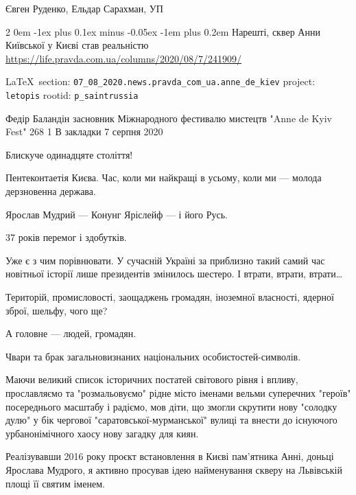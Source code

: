 \documentclass[a4paper,11pt]{extreport}
\makeatletter
\renewcommand\subsection{%
  \clearpage
    \@startsection{subsection}%
    {2}%
    {0em}%
    {-1ex plus 0.1ex minus -0.05ex}%
    {-1em plus 0.2em}%
    {\scshape\bfseries\Large}%
}
\makeatother
\begin{document}
Євген Руденко, Ельдар Сарахман, УП
 
 
\subsection{Нарешті, сквер Анни Київської у Києві став реальністю}
\label{sec:07_08_2020.news.pravda_com_ua.anne_de_kiev}
\url{https://life.pravda.com.ua/columns/2020/08/7/241909/}
  
\vspace{0.5cm}
 {\ifDEBUG\small\LaTeX~section: \verb|07_08_2020.news.pravda_com_ua.anne_de_kiev| project: \verb|letopis| rootid: \verb|p_saintrussia| \fi}
\vspace{0.5cm}

Федір Баландін засновник Міжнародного фестивалю мистецтв "Anne de Kyiv Fest"
268 1 В закладки 7 серпня 2020

Блискуче одинадцяте століття!

Пентеконтаетія Києва. Час, коли ми найкращі в усьому, коли ми --- молода
дерзновенна держава.

Ярослав Мудрий --- Конунг Яріслейф --- і його Русь.

37 років перемог і здобутків.

Уже є з чим порівнювати. У сучасній Україні за приблизно такий самий час
новітньої історії лише президентів змінилось шестеро. І втрати, втрати, втрати…

Територій, промисловості, заощаджень громадян, іноземної власності, ядерної
зброї, шельфу, чого ще?

А головне --- людей, громадян.

Чвари та брак загальновизнаних національних особистостей-символів.

Маючи великий список історичних постатей світового рівня і впливу, прославляємо
та "розмальовуємо" рідне місто іменами вельми суперечних "героїв" посереднього
масштабу і радіємо, мов діти, що змогли скрутити нову "солодку дулю" у бік
чергової "саратовської-мурманської" вулиці та внести до існуючого
урбанонімічного хаосу нову загадку для киян.

Реалізувавши 2016 року проєкт встановлення в Києві пам’ятника Анні, доньці
Ярослава Мудрого, я активно просував ідею найменування скверу на Львівській
площі її святим іменем.
\end{document}
